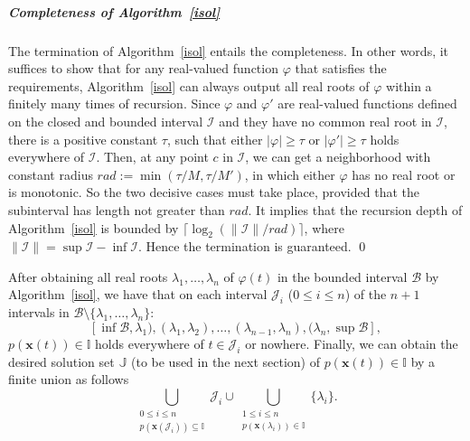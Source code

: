 \documentclass[a4paper,UKenglish,cleveref,autoref,thm-restate,authorcolumns]{lipics-v2019}
\newcommand{\I}{\mathcal{I}}
\newcommand{\II}{\mathbb{I}}
\newcommand{\J}{\mathcal{J}}
\newcommand{\JJ}{\mathbb{J}}
\newcommand{\x}{\mathbf{x}}
\begin{document}
	
\subparagraph*{Completeness of Algorithm~\ref{isol}}
The termination of Algorithm~\ref{isol} entails the completeness.
In other words, it suffices to show that
for any real-valued function $\varphi$ that satisfies the requirements,
Algorithm~\ref{isol} can always output all real roots of $\varphi$
within a finitely many times of recursion.
Since $\varphi$ and $\varphi'$ are real-valued functions defined
on the closed and bounded interval $\I$
and they have no common real root in $\I$,
there is a positive constant $\tau$,
such that either $|\varphi| \ge \tau$ or $|\varphi'| \ge \tau$ holds everywhere of $\I$.
Then, at any point $c$ in $\I$,
we can get a neighborhood with constant radius $rad:=\min(\tau/M,\tau/M')$,
in which either $\varphi$ has no real root or is monotonic.
So the two decisive cases must take place,
provided that the subinterval has length not greater than $rad$.
It implies that the recursion depth of Algorithm~\ref{isol} is bounded
by $\lceil \log_2(\|\I\|/rad) \rceil$, where $\|\I\| = \sup\I-\inf\I$.
Hence the termination is guaranteed. \qed

After obtaining all real roots $\lambda_1,\ldots,\lambda_n$ of $\varphi(t)$
in the bounded interval $\mathcal{B}$ by Algorithm~\ref{isol},
we have that
on each interval $\J_i$ ($0 \le i \le n$) of the $n+1$ intervals
in $\mathcal{B}\setminus\{\lambda_1,\ldots,\lambda_n\}$:
\begin{equation}\label{eq:interval}
	[\inf\mathcal{B},\lambda_1),(\lambda_1,\lambda_2),\ldots,
	(\lambda_{n-1},\lambda_n),(\lambda_n,\sup\mathcal{B}],
\end{equation}
$p(\x(t)) \in \II$ holds everywhere of $t\in \J_i$ or nowhere.
Finally, we can obtain the desired solution set $ \JJ$ (to be used in the next section)
of $p(\x(t)) \in \II$ by a finite union as follows
\begin{equation}
   \bigcup_{\substack{0 \le i \le n \\ p(\x(\J_i)) \subseteq \II}} \J_i  \cup
    \bigcup_{\substack{1 \le i \le n \\ p(\x(\lambda_i)) \in \II}} \{\lambda_i\}.
\end{equation}
\end{document}
